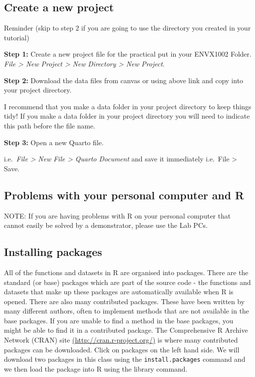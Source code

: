 \documentclass[
  10pt,
  letterpaper,
  DIV=11,
  numbers=noendperiod]{scrartcl}
\begin{document}
\hypertarget{create-a-new-project}{%
\subsection{Create a new project}\label{create-a-new-project}}

Reminder (skip to step 2 if you are going to use the directory you
created in your tutorial)

\textbf{Step 1:} Create a new project file for the practical put in your
ENVX1002 Folder. \emph{File \textgreater{} New Project \textgreater{}
New Directory \textgreater{} New Project}.

\textbf{Step 2:} Download the data files from canvas or using above link
and copy into your project directory.

I recommend that you make a data folder in your project directory to
keep things tidy! If you make a data folder in your project directory
you will need to indicate this path before the file name.

\textbf{Step 3:} Open a new Quarto file.

i.e.~\emph{File \textgreater{} New File \textgreater{} Quarto Document}
and save it immediately i.e.~File \textgreater{} Save.

\hypertarget{problems-with-your-personal-computer-and-r}{%
\subsection{Problems with your personal computer and
R}\label{problems-with-your-personal-computer-and-r}}

NOTE: If you are having problems with R on your personal computer that
cannot easily be solved by a demonstrator, please use the Lab PCs.

\hypertarget{installing-packages}{%
\subsection{Installing packages}\label{installing-packages}}

All of the functions and datasets in R are organised into packages.
There are the standard (or base) packages which are part of the source
code - the functions and datasets that make up these packages are
automatically available when R is opened. There are also many
contributed packages. These have been written by many different authors,
often to implement methods that are not available in the base packages.
If you are unable to find a method in the base packages, you might be
able to find it in a contributed package. The Comprehensive R Archive
Network (CRAN) site
\href{http://cran.r-project.org/}{(http://cran.r-project.org/)} is where
many contributed packages can be downloaded. Click on packages on the
left hand side. We will download two packages in this class using the
\texttt{install.packages} command and we then load the package into R
using the library command.
\end{document}
